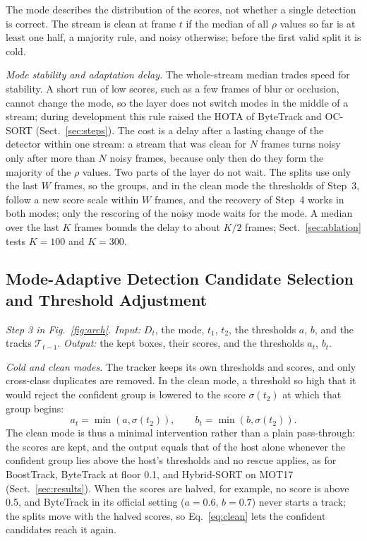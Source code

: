 \documentclass[pdflatex,sn-mathphys-num,iicol]{sn-jnl}
\begin{document}
The mode describes the distribution of the scores, not whether a single detection is correct. The
stream is clean at frame $t$ if the median of all $\rho$ values so far is at least one half, a
majority rule, and noisy otherwise; before the first valid split it is cold.

\emph{Mode stability and adaptation delay.} The whole-stream median trades speed for stability. A
short run of low scores, such as a few frames of blur or occlusion, cannot change the mode, so the
layer does not switch modes in the middle of a stream; during development this rule raised the
HOTA of ByteTrack and OC-SORT (Sect.~\ref{sec:steps}). The cost is a delay after a lasting change
of the detector within one stream: a stream that was clean for $N$ frames turns noisy only after
more than $N$ noisy frames, because only then do they form the majority of the $\rho$ values. Two
parts of the layer do not wait. The splits use only the last $W$ frames, so the groups, and in
the clean mode the thresholds of Step~3, follow a new score scale within $W$ frames, and the
recovery of Step~4 works in both modes; only the rescoring of the noisy mode waits for the mode. A
median over the last $K$ frames bounds the delay to about $K/2$ frames;
Sect.~\ref{sec:ablation} tests $K=100$ and $K=300$.

\subsection{Mode-Adaptive Detection Candidate Selection and Threshold Adjustment}\label{sec:choice}
\emph{Step 3 in Fig.~\ref{fig:arch}. Input:} $D_t$, the mode, $t_1$, $t_2$, the thresholds $a$, $b$, and the tracks
$\mathcal{T}_{t-1}$. \emph{Output:} the kept boxes, their scores, and the thresholds $a_t$, $b_t$.

\emph{Cold and clean modes.} The tracker keeps its own thresholds and scores, and only cross-class
duplicates are removed. In the clean mode, a threshold so high that it would reject the confident
group is lowered to the score $\sigma(t_2)$ at which that group begins:
\begin{equation}
a_t=\min\!\left(a,\sigma(t_2)\right),\qquad b_t=\min\!\left(b,\sigma(t_2)\right).
\label{eq:clean}
\end{equation}
The clean mode is thus a minimal intervention rather than a plain pass-through: the scores are
kept, and the output equals that of the host alone whenever the confident group lies above the
host's thresholds and no rescue applies, as for BoostTrack, ByteTrack at floor 0.1, and Hybrid-SORT
on MOT17 (Sect.~\ref{sec:results}). When the scores are halved, for example, no score is above 0.5,
and ByteTrack in its official setting ($a=0.6$, $b=0.7$) never starts a track; the splits move with
the halved scores, so Eq.~\eqref{eq:clean} lets the confident candidates reach it again.
\end{document}
